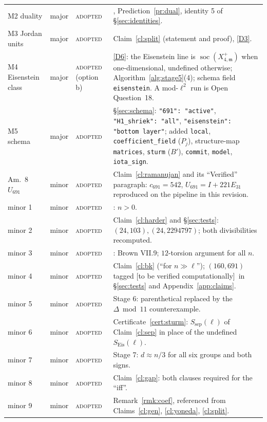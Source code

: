 \documentclass[11pt]{article}
\theoremstyle{remark}
\newcommand{\De}{\Delta}
\DeclareMathOperator{\soc}{soc}
\newcommand{\m}{\mathfrak{m}}
\newcommand{\HA}[1]{[C,~\texttt{#1}]}      %
\newcommand{\VERIFY}{\textsf{[to be verified computationally]}}
\begin{document}
\begin{center}
\begin{longtable}{@{}>{\raggedright\arraybackslash}p{1.6cm}>{\raggedright\arraybackslash}p{1.4cm}>{\raggedright\arraybackslash}p{2.3cm}>{\raggedright\arraybackslash}p{10.2cm}@{}}
M2 duality & major & \textsc{adopted} & \HA{cl:pd}, Prediction~\ref{pr:dual}, identity 5 of \S\ref{sec:identities}. \\
M3 Jordan units & major & \textsc{adopted} & Claim~\ref{cl:split} (statement and proof), \ref{D3}. \\
M4 Eisenstein class & major & \textsc{adopted} (option b) & \ref{D6}: the Eisenstein line is $\soc(X^+_{4,\m})$ when one-dimensional, undefined otherwise; Algorithm~\ref{alg:stage5}(4); schema field \texttt{eisenstein}. A mod-$\ell^2$ run is Open Question~18. \\
M5 schema & major & \textsc{adopted} & \S\ref{sec:schema}: \texttt{"691": "active"}, \texttt{"H1\_shriek": "all"}, \texttt{"eisenstein": "bottom layer"}; added \texttt{local}, \texttt{coefficient\_field} ($P_j$), structure-map \texttt{matrices}, \texttt{sturm} ($B'$), \texttt{commit}, \texttt{model}, \texttt{iota\_sign}. \\
Am.~8 $U_{691}$ & minor & \textsc{adopted} & Claim~\ref{cl:ramanujan} and its ``Verified'' paragraph: $c_{691}=542$, $U_{691}=I+221E_{31}$ reproduced on the pipeline in this revision. \\
minor 1 & minor & \textsc{adopted} & \HA{cl:bockstein}: $n>0$. \\
minor 2 & minor & \textsc{adopted} & Claim~\ref{cl:harder} and \S\ref{sec:tests}: $(24,103),(24,2294797)$; both divisibilities recomputed. \\
minor 3 & minor & \textsc{adopted} & \HA{cl:amalgam}: Brown VII.9; $12$-torsion argument for all $n$. \\
minor 4 & minor & \textsc{adopted} & Claim~\ref{cl:bk} (``for $n\gg\ell$''); $(160,691)$ tagged \VERIFY\ in \S\ref{sec:tests} and Appendix~\ref{app:claims}. \\
minor 5 & minor & \textsc{adopted} & Stage 6: parenthetical replaced by the $\De\bmod11$ counterexample. \\
minor 6 & minor & \textsc{adopted} & Certificate~\ref{cert:sturm}: $S_{\mathrm{sep}}(\ell)$ of Claim~\ref{cl:sep} in place of the undefined $S_{\mathrm{Eis}}(\ell)$. \\
minor 7 & minor & \textsc{adopted} & Stage 7: $d\approx n/3$ for all six groups and both signs. \\
minor 8 & minor & \textsc{adopted} & Claim~\ref{cl:gap}: both clauses required for the ``iff''. \\
minor 9 & minor & \textsc{adopted} & Remark~\ref{rmk:coef}, referenced from Claims~\ref{cl:gen}, \ref{cl:yoneda}, \ref{cl:split}. \\

\end{longtable}
\end{center}
\end{document}
